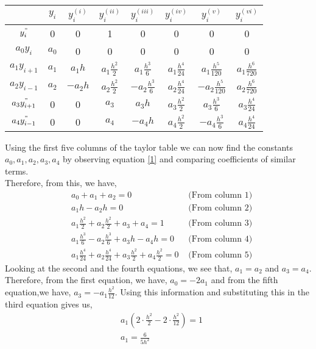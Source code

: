 \documentclass[letterpaper]{exam}
\begin{document}
\begin{questions}
\begin{parts}
\begin{solution}
\begin{center}
\begin{tabular}{|c|c|c|c|c|c|c|c|}
&$y_i$&$y_i^{(i)}$&$y_i^{(ii)}$&$y_i^{(iii)}$&$y_i^{(iv)}$&$y_i^{(v)}$&$y_i^{(vi)}$\\
\hline

     $y_i^{"}$&0&0&1&0&0&0&0\\
\hline

     $a_0y_i$&$a_0$&0&0&0&0&0&0\\
\hline

     $a_1y_{i+1}$&$a_1$&$a_1h$&$a_1\frac{h^2}{2}$&$a_1\frac{h^3}{6}$&$a_1\frac{h^4}{24}$&$a_1\frac{h^5}{120}$&$a_1\frac{h^6}{720}$\\
\hline
     $a_2y_{i-1}$&$a_2$&$-a_2h$&$a_2\frac{h^2}{2}$&$-a_2\frac{h^3}{6}$&$a_2\frac{h^4}{24}$&$-a_2\frac{h^5}{120}$&$a_2\frac{h^6}{720}$\\
\hline
     $a_3y_{i+1}^{"}$&0&0&$a_3$&$a_3h$&$a_3\frac{h^2}{2}$&$a_3\frac{h^3}{6}$&$a_3\frac{h^4}{24}$\\
\hline
     $a_4y_{i-1}^{"}$&0&0&$a_4$&$-a_4h$&$a_4\frac{h^2}{2}$&$-a_4\frac{h^3}{6}$&$a_4\frac{h^4}{24}$\\
\hline
\end{tabular}
\end{center}
Using the first five columns of the taylor table we can now find the constants $a_0,a_1,a_2,a_3,a_4$ by observing equation \ref{1} and comparing coefficients of similar terms.\\
Therefore, from this, we have,
\begin{align*}
    &a_0 + a_1 + a_2 = 0 &\mbox{ (From column 1)}\\
    &a_1h - a_2h     = 0 &\mbox{ (From column 2)}\\
    &a_1\frac{h^2}{2} + a_2\frac{h^2}{2} + a_3 + a_4 = 1 &\mbox{ (From column 3)}\\
    &a_1\frac{h^3}{6} - a_2\frac{h^3}{6} + a_3h - a_4h = 0 &\mbox{ (From column 4)}\\
    &a_1\frac{h^4}{24} + a_2\frac{h^4}{24} + a_3\frac{h^2}{2} + a_4\frac{h^2}{2} = 0 &\mbox{ (From column 5)}
\end{align*}
Looking at the second and the fourth equations, we see that, $a_1 = a_2$ and $a_3 = a_4$. Therefore, from the first equation, we have, $a_0 = -2a_1$ and from the fifth equation,we have, $a_3 = -a_1 \frac{h^2}{12}$. Using this information and substituting this in the third equation gives us,
\begin{align*}
    &a_1\left(2\cdot\frac{h^2}{2} -2\cdot\frac{h^2}{12}\right) = 1\\
    &a_1 = \frac{6}{5h^2}
\end{align*}

\end{solution}
\end{parts}
\end{questions}
\end{document}
